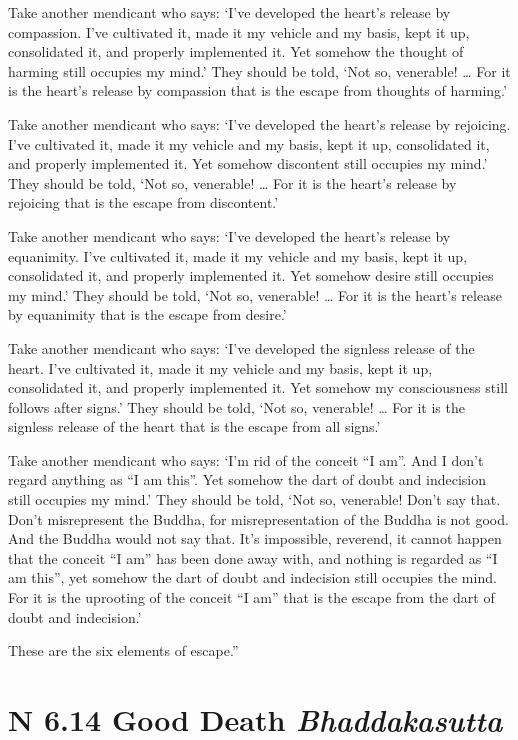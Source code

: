 \documentclass[12pt,openany]{book}%
\newcommand*{\suttatitleacronym}[1]{\smaller[2]{#1}\vspace*{.3em}}
\newcommand*{\suttatitletranslation}[1]{\linebreak{#1}}
\newcommand*{\suttatitleroot}[1]{\linebreak\smaller[2]\itshape{#1}}
\newcommand*{\tocacronym}[1]{\hspace*{-3.3em}{#1}\quad}
\newcommand*{\toctranslation}[1]{#1}
\newcommand*{\tocroot}[1]{(\textit{#1})}
\begin{document}
Take another mendicant who says: ‘I’ve developed the heart’s release by compassion. I’ve cultivated it, made it my vehicle and my basis, kept it up, consolidated it, and properly implemented it. Yet somehow the thought of harming still occupies my mind.’ They should be told, ‘Not so, venerable! … For it is the heart’s release by compassion that is the escape from thoughts of harming.’ 

Take another mendicant who says: ‘I’ve developed the heart’s release by rejoicing. I’ve cultivated it, made it my vehicle and my basis, kept it up, consolidated it, and properly implemented it. Yet somehow discontent still occupies my mind.’ They should be told, ‘Not so, venerable! … For it is the heart’s release by rejoicing that is the escape from discontent.’ 

Take another mendicant who says: ‘I’ve developed the heart’s release by equanimity. I’ve cultivated it, made it my vehicle and my basis, kept it up, consolidated it, and properly implemented it. Yet somehow desire still occupies my mind.’ They should be told, ‘Not so, venerable! … For it is the heart’s release by equanimity that is the escape from desire.’ 

Take another mendicant who says: ‘I’ve developed the signless release of the heart. I’ve cultivated it, made it my vehicle and my basis, kept it up, consolidated it, and properly implemented it. Yet somehow my consciousness still follows after signs.’ They should be told, ‘Not so, venerable! … For it is the signless release of the heart that is the escape from all signs.’ 

Take another mendicant who says: ‘I’m rid of the conceit “I am”. And I don’t regard anything as “I am this”. Yet somehow the dart of doubt and indecision still occupies my mind.’ They should be told, ‘Not so, venerable! Don’t say that. Don’t misrepresent the Buddha, for misrepresentation of the Buddha is not good. And the Buddha would not say that. It’s impossible, reverend, it cannot happen that the conceit “I am” has been done away with, and nothing is regarded as “I am this”, yet somehow the dart of doubt and indecision still occupies the mind. For it is the uprooting of the conceit “I am” that is the escape from the dart of doubt and indecision.’ 

These are the six elements of escape.” 

%
\section*{{\suttatitleacronym AN 6.14}{\suttatitletranslation A Good Death }{\suttatitleroot Bhaddakasutta}}
\addcontentsline{toc}{section}{\tocacronym{AN 6.14} \toctranslation{A Good Death } \tocroot{Bhaddakasutta}}
\end{document}
